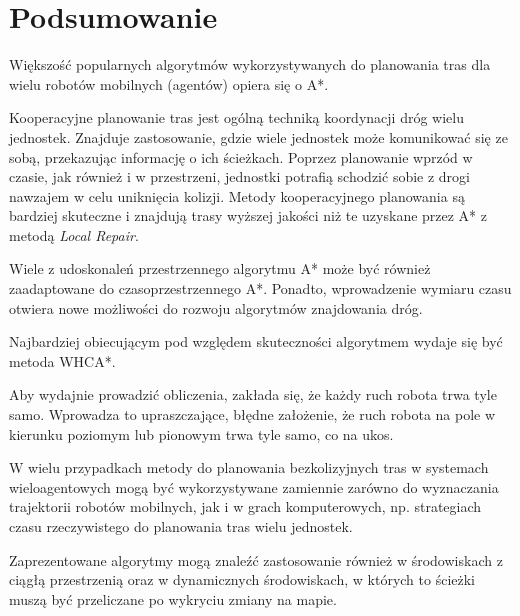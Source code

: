 \section{Podsumowanie}

Większość popularnych algorytmów wykorzystywanych do planowania tras dla wielu robotów mobilnych (agentów) opiera się o A*.

Kooperacyjne planowanie tras jest ogólną techniką koordynacji dróg wielu jednostek.
Znajduje zastosowanie, gdzie wiele jednostek może komunikować się ze sobą, przekazując informację o ich ścieżkach.
Poprzez planowanie wprzód w czasie, jak również i w przestrzeni, jednostki potrafią schodzić sobie z drogi nawzajem w celu uniknięcia kolizji.
Metody kooperacyjnego planowania są bardziej skuteczne i znajdują trasy wyższej jakości niż te uzyskane przez A* z metodą {\it Local Repair}.

Wiele z udoskonaleń przestrzennego algorytmu A* może być również zaadaptowane do czasoprzestrzennego A*.
Ponadto, wprowadzenie wymiaru czasu otwiera nowe możliwości do rozwoju algorytmów znajdowania dróg.

Najbardziej obiecującym pod względem skuteczności algorytmem wydaje się być metoda WHCA*.

Aby wydajnie prowadzić obliczenia, zakłada się, że każdy ruch robota trwa tyle samo. 
Wprowadza to upraszczające, błędne założenie, że ruch robota na pole w kierunku poziomym lub pionowym trwa tyle samo, co na ukos.

W wielu przypadkach metody do planowania bezkolizyjnych tras w systemach wieloagentowych mogą być wykorzystywane zamiennie zarówno do wyznaczania trajektorii robotów mobilnych, jak i w grach komputerowych, np. strategiach czasu rzeczywistego do planowania tras wielu jednostek.

Zaprezentowane algorytmy mogą znaleźć zastosowanie również w środowiskach z ciągłą przestrzenią oraz w dynamicznych środowiskach, w których to ścieżki muszą być przeliczane po wykryciu zmiany na mapie.
